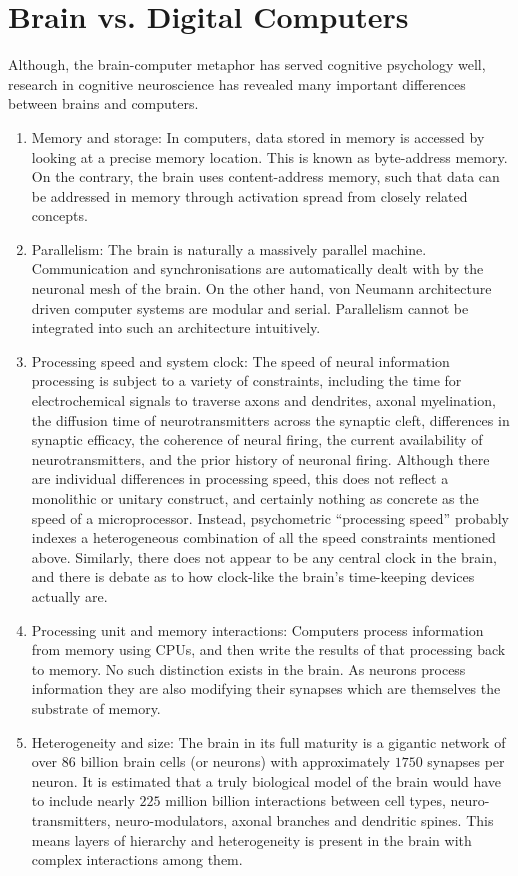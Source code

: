 \section{Brain vs. Digital Computers}
 Although, the brain-computer metaphor has served cognitive psychology well, research in cognitive neuroscience has revealed many important differences between brains and computers.
\begin{enumerate}
	\item Memory and storage: In computers, data stored in memory is accessed by looking at a precise memory location. This is known as byte-address memory. On the contrary, the brain uses content-address memory, such that data can be addressed in memory through activation spread from closely related concepts.
	
	\item Parallelism: The brain is naturally a massively parallel machine. Communication and synchronisations are automatically dealt with by the neuronal mesh of the brain. On the other hand, von Neumann architecture driven computer systems are modular and serial. Parallelism cannot be integrated into such an architecture intuitively.
	
	\item Processing speed and system clock: The speed of neural information processing is subject to a variety of constraints, including the time for electrochemical signals to traverse axons and dendrites, axonal myelination, the diffusion time of neurotransmitters across the synaptic cleft, differences in synaptic efficacy, the coherence of neural firing, the current availability of neurotransmitters, and the prior history of neuronal firing. Although there are individual differences in processing speed, this does not reflect a monolithic or unitary construct, and certainly nothing as concrete as the speed of a microprocessor. Instead, psychometric “processing speed” probably indexes a heterogeneous combination of all the speed constraints mentioned above. Similarly, there does not appear to be any central clock in the brain, and there is debate as to how clock-like the brain’s time-keeping devices actually are.
	
	\item Processing unit and memory interactions: Computers process information from memory using CPUs, and then write the results of that processing back to memory. No such distinction exists in the brain. As neurons process information they are also modifying their synapses which are themselves the substrate of memory. 
	
	\item Heterogeneity and size: The brain in its full maturity is a gigantic network of over $86$ billion brain cells (or neurons) with approximately $1750$ synapses per neuron. It is estimated that a truly biological model of the brain would have to include nearly $225$ million billion interactions between cell types, neuro-transmitters, neuro-modulators, axonal branches and dendritic spines. This means layers of hierarchy and heterogeneity is present in the brain with complex interactions among them. 
\end{enumerate} 

